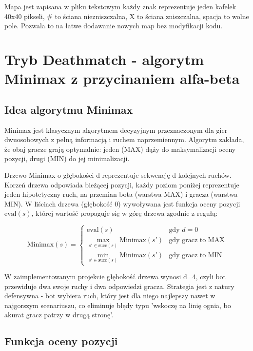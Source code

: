 Mapa jest zapisana w pliku tekstowym każdy znak reprezentuje 
jeden kafelek 40x40 pikseli, \# to ściana niezniszczalna, X to ściana zniszczalna, spacja to wolne pole. 
Pozwala to na łatwe dodawanie nowych map bez modyfikacji kodu.

\section{Tryb Deathmatch - algorytm Minimax z przycinaniem alfa-beta}
\subsection{Idea algorytmu Minimax}

Minimax jest klasycznym algorytmem decyzyjnym przeznaczonym dla gier dwuosobowych z pełną informacją i ruchem naprzemiennym. 
Algorytm zakłada, że obaj gracze grają optymalnie: jeden (MAX) dąży do maksymalizacji oceny pozycji, drugi (MIN) do jej minimalizacji.
 
Drzewo Minimax o głębokości d reprezentuje sekwencję d kolejnych ruchów. Korzeń drzewa odpowiada 
bieżącej pozycji, każdy poziom poniżej reprezentuje jeden hipotetyczny ruch, na przemian bota (warstwa MAX) i gracza (warstwa MIN). 
W liściach drzewa (głębokość 0) wywoływana jest funkcja oceny pozycji $\text{eval}(s)$, której wartość propaguje się w górę 
drzewa zgodnie z regułą:
 
\begin{equation}
\text{Minimax}(s) =
\begin{cases}
\text{eval}(s) & \text{gdy } d = 0 \\
\max_{s' \in \text{succ}(s)} \text{Minimax}(s') & \text{gdy gracz to MAX} \\
\min_{s' \in \text{succ}(s)} \text{Minimax}(s') & \text{gdy gracz to MIN}
\end{cases}
\end{equation}
 
W zaimplementowanym projekcie głębokość drzewa wynosi d=4, czyli bot przewiduje dwa swoje ruchy i dwa odpowiedzi gracza. 
Strategia jest z natury defensywna - bot wybiera ruch, który jest dla niego najlepszy nawet w najgorszym scenariuszu, co eliminuje
błędy typu 'wskoczę na linię ognia, bo akurat gracz patrzy w drugą stronę'.
 
\subsection{Funkcja oceny pozycji}

